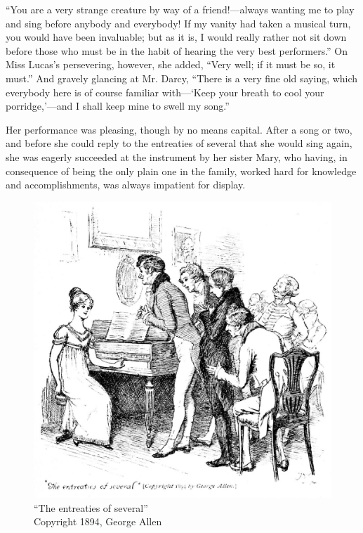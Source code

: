 ``You are a very strange creature by way of a friend!---always wanting me to play and sing before anybody and everybody! If my vanity had taken a musical turn, you would have been invaluable; but as it is, I would really rather not sit down before those who must be in the habit of hearing the very best performers.'' On Miss Lucas's persevering, however, she added, ``Very well; if it must be so, it must.'' And gravely glancing at Mr. Darcy, ``There is a very fine old saying, which everybody here is of course familiar with---`Keep your breath to cool your porridge,'---and I shall keep mine to swell my song.''

Her performance was pleasing, though by no means capital. After a song or two, and before she could reply to the entreaties of several that she would sing again, she was eagerly succeeded at the instrument by her sister Mary, who having, in consequence of being the only plain one in the family, worked hard for knowledge and accomplishments, was always impatient for display.


\begin{figure}[htbp]
    \centering
    \includegraphics[width=\textwidth]{illustrations/i_060.jpg}
    \caption{“The entreaties of several”\\ Copyright 1894, George Allen}
    \label{fig:image}
\end{figure}

